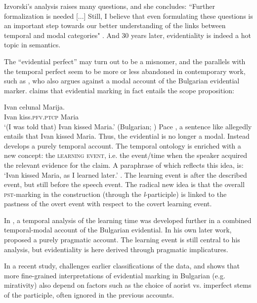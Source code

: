 \documentclass[output=paper,colorlinks,citecolor=brown]{langscibook}
\begin{document}
Izvorski's  analysis raises many questions, and she concludes:
``Further formalization is needed {[}...{]}
Still, I believe that even formulating these questions is an 
important step towards our better understanding of the links between temporal and 
modal categories" \citep[235]{Izvorski1997}. And 30 years later, evidentiality is indeed a hot topic in semantics. 

The ``evidential perfect'' may turn out to be a misnomer, and the parallels with the temporal perfect seem to be more or less abandoned in  contemporary work, such as  \citet{Koev2017a}, who also argues against a modal account of the Bulgarian evidential marker.
\citet{koev2011} claims that evidential marking in fact entails the scope proposition:

\ea\label{koev}\gll
Ivan celunal Marija.\\
Ivan kiss.\textsc{pfv}.\textsc{ptcp} 
Maria \\
\glt
‘(I was told that) Ivan kissed Maria.’
\hfill (Bulgarian; \cite[116]{koev2011})
\z
Pace \citet{Izvorski1997}, a sentence like  allegedly entails that Ivan kissed Maria. Thus, the evidential is no longer a modal. Instead \citet{koev2011} develops a purely temporal account. The temporal ontology is enriched with a new concept: the \textsc{learning event}, i.e. the event/time when the speaker acquired the relevant evidence for the claim. A paraphrase of  which reflects this idea, is: ‘Ivan kissed Maria, as I learned later.’ \citep[124]{koev2011}. The learning event is after the described event, but still before  the speech event. The radical new idea is that the overall \textsc{pst}-marking in the construction (through the \textit{l}-participle) is linked to the pastness of the overt event with respect to the covert learning event.

In \citet{Smirnova2013}, a temporal analysis of the learning time was developed further in a combined temporal-modal account of the Bulgarian evidential. 
In his own later work,
\citet{Koev2017a} proposed a purely pragmatic account. The learning event is still central to his analysis, but evidentiality is here derived through pragmatic implicatures. 

In a recent study, 
\citet{Karagjosova2021} challenges earlier classifications of the data, and shows that more fine-grained interpretations of evidential marking in Bulgarian (e.g. mirativity) also depend on factors such as the choice of aorist vs. imperfect stems of the participle, often ignored in the previous accounts. 
\end{document}
